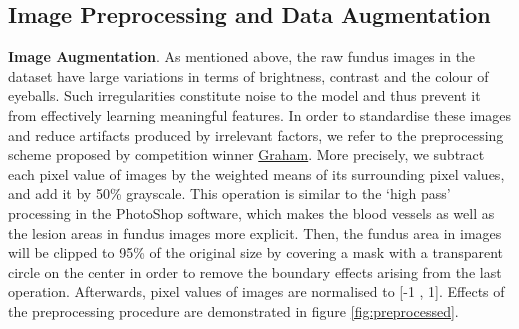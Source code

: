 \documentclass[../main.tex]{subfiles}
\begin{document}
\subsection{Image Preprocessing and Data Augmentation}
\textbf{Image Augmentation}. As mentioned above, the raw fundus images in the dataset have large variations in terms of brightness, contrast and the colour of eyeballs. Such irregularities constitute noise to the model and thus prevent it from effectively learning meaningful features. In order to standardise these images and reduce artifacts produced by irrelevant factors, we refer to the preprocessing scheme proposed by competition winner \href{https://storage.googleapis.com/kaggle-forum-message-attachments/88655/2795/competitionreport.pdf}{Graham}. More precisely, we subtract each pixel value of images by the weighted means of its surrounding pixel values, and add it by 50\% grayscale. This operation is similar to the ‘high pass’ processing in the PhotoShop software, which makes the blood vessels as well as the lesion areas in fundus images more explicit. Then, the fundus area in images will be clipped to 95\% of the original size by covering a mask with a transparent circle on the center in order to remove the boundary effects arising from the last operation. Afterwards, pixel values of images are normalised to [-1 , 1]. Effects of the preprocessing procedure are demonstrated in figure \ref{fig:preprocessed}. 
\end{document}
